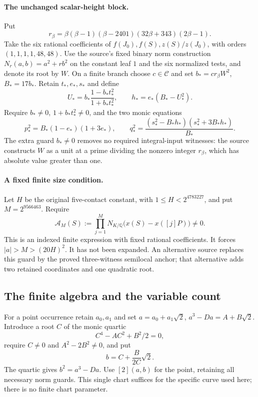 \paragraph{The unchanged scalar-height block.}
Put
\[
 r_\beta=\beta(\beta-1)(\beta-2401)(32\beta+343)(2\beta-1).
\]
Take the six rational coefficients of
$f(J_0),f(S),z(S)/z(J_0)$, with orders $(1,1,1,1,48,48)$.
Use the source's fixed binary norm construction $N_r(a,b)=a^2+rb^2$
on the constant leaf $1$ and the six normalized tests, and denote its
root by $W$. On a finite branch choose $c\in\mathcal C$ and set
$b_*=cr_\beta W^2$, $B_*=17b_*$. Retain $t_*,e_*,s_*$ and define
\[
 U_* =b_*\frac{1-b_*t_*^2}{1+b_*t_*^2},\qquad
 h_*=e_*(B_*-U_*^2).
\]
Require $b_*\ne0$, $1+b_*t_*^2\ne0$, and the two monic equations
\[
 p_*^2=B_*(1-e_*)(1+3e_*),\qquad
 q_*^2=\frac{(s_*^2-B_*h_*)(s_*^2+3B_*h_*)}{B_*}.
\]
The extra guard $b_*\ne0$ removes no required integral-input witnesses:
the source constructs $W$ as a unit at a prime dividing the nonzero
integer $r_\beta$, which has absolute value greater than one.

\paragraph{A fixed finite size condition.}
Let $H$ be the original five-contact constant, with
$1\le H<2^{4783227}$, and put $M=2^{9566463}$. Require
\[
 \mathcal A_M(S):=\prod_{j=1}^M
 N_{K/\mathbb Q}\bigl(x(S)-x([j]P)\bigr)\ne0.
\]
This is an indexed finite expression with fixed rational coefficients.
It forces $|a|>M>(20H)^2$. It has not been expanded. An alternative
source replaces this guard by the proved three-witness semilocal anchor;
that alternative adds two retained coordinates and one quadratic root.

\subsection{The finite algebra and the variable count}
For a point occurrence retain $a_0,a_1$ and set $a=a_0+a_1\sqrt2$,
$a^3-Da=A+B\sqrt2$. Introduce a root $C$ of the monic quartic
\[
 C^4-AC^2+B^2/2=0,
\]
require $C\ne0$ and $A^2-2B^2\ne0$, and put
\[
 b=C+\frac{B}{2C}\sqrt2.
\]
The quartic gives $b^2=a^3-Da$. Use $[2](a,b)$ for the point,
retaining all necessary norm guards. This single chart suffices for
the specific curve used here; there is no finite chart parameter.

